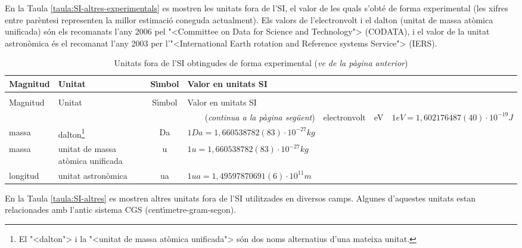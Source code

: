En la Taula \vref{taula:SI-altres-experimentals} es mostren les unitats fora de l'SI, el valor de les quals s'obt\'{e} de forma experimental (les xifres entre par\`{e}ntesi representen la millor estimaci\'{o} coneguda actualment). Els valors de l'electronvolt i el dalton (unitat de massa at\`{o}mica unificada) s\'{o}n els recomanats
l'any 2006 pel {"<}Committee on Data for Science and Technology{">} (\textsf{CODATA}), i el valor de la unitat astron\`{o}mica \'{e}s el recomanat l'any 2003 per l'{"<}International Earth rotation and Reference systems Service{">} (\textsf{IERS}).

\begin{longtable}[h]{llcl}
   \caption{\label{taula:SI-altres-experimentals} Unitats fora de l'SI obtingudes de forma experimental }\\
   \toprule[1pt]
    Magnitud & Unitat &  S\'{\i}mbol & Valor en unitats SI\\
   \midrule
   \endfirsthead
   \caption[]{Unitats fora de l'SI obtingudes de forma experimental (\emph{ve de la p\`{a}gina
   anterior})}\\
   \toprule[1pt]
    Magnitud & Unitat &  S\'{\i}mbol & Valor en unitats SI\\
   \midrule
   \endhead
   \midrule
   \multicolumn{4}{r}{(\emph{continua a la p\`{a}gina seg\"{u}ent})}
   \endfoot
   \endlastfoot
   energia & electronvolt & \unit{eV} & $1\unit{eV} = 1{,}602176487(40)\cdot 10^{-19}\unit{J}$ \\
   massa & dalton\footnote{El {"<}dalton{">} i la {"<}unitat de massa at\`{o}mica unificada{">} s\'{o}n dos noms alternatius d'una mateixa unitat.}& Da & $1\unit{Da} = 1{,}660538782(83)\cdot 10^{-27}\unit{kg}$\\
   massa & unitat de massa at\`{o}mica unificada\footnotemark[3] & u & $1\unit{u} = 1{,}660538782(83)\cdot 10^{-27}\unit{kg}$  \\
   longitud & unitat astron\`{o}mica &  \unit{ua }& $1\unit{ua} =  1{,}49597870691(6)\cdot 10^{11}\unit{m}$ \\
\bottomrule[1pt]
\end{longtable}


En la Taula \vref{taula:SI-altres} es mostren altres unitats fora de l'SI utilitzades en diversos camps. Algunes d'aquestes unitats estan relacionades amb l'antic sistema CGS (cent\'{\i}metre-gram-segon).


